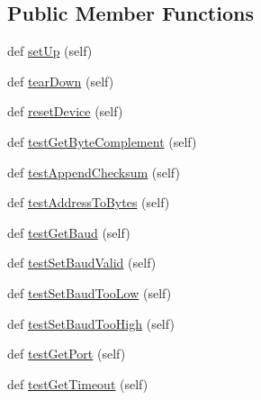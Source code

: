 \subsection*{Public Member Functions}
\begin{DoxyCompactItemize}
\item 
def \hyperlink{classstm__tools_1_1tests_1_1serialflasher__test_1_1SerialFlasherTestCase_a26b1b5aaa859d024cb7114cc1d4c1fd2}{set\+Up} (self)
\item 
def \hyperlink{classstm__tools_1_1tests_1_1serialflasher__test_1_1SerialFlasherTestCase_a56c54e463c817da67a20bb5e7b3b433a}{tear\+Down} (self)
\item 
def \hyperlink{classstm__tools_1_1tests_1_1serialflasher__test_1_1SerialFlasherTestCase_a3c64ad4ffc70313fb320cbff348ca340}{reset\+Device} (self)
\item 
def \hyperlink{classstm__tools_1_1tests_1_1serialflasher__test_1_1SerialFlasherTestCase_a6196826ae4218aa1d998d46082d63e32}{test\+Get\+Byte\+Complement} (self)
\item 
def \hyperlink{classstm__tools_1_1tests_1_1serialflasher__test_1_1SerialFlasherTestCase_ab3bae2350dc5fe3a1648fade1f3a220e}{test\+Append\+Checksum} (self)
\item 
def \hyperlink{classstm__tools_1_1tests_1_1serialflasher__test_1_1SerialFlasherTestCase_a7b9e64e2d4d21e7661b78b9be72fbc5c}{test\+Address\+To\+Bytes} (self)
\item 
def \hyperlink{classstm__tools_1_1tests_1_1serialflasher__test_1_1SerialFlasherTestCase_aa04254363060fbf88e9842fc5af0e984}{test\+Get\+Baud} (self)
\item 
def \hyperlink{classstm__tools_1_1tests_1_1serialflasher__test_1_1SerialFlasherTestCase_a09aac660829ca8fa8f1756fed0259dbf}{test\+Set\+Baud\+Valid} (self)
\item 
def \hyperlink{classstm__tools_1_1tests_1_1serialflasher__test_1_1SerialFlasherTestCase_aba049008f1b0bf098a9e9f385605f2b7}{test\+Set\+Baud\+Too\+Low} (self)
\item 
def \hyperlink{classstm__tools_1_1tests_1_1serialflasher__test_1_1SerialFlasherTestCase_a166cbd10369a00e75b9007161f8b4e2a}{test\+Set\+Baud\+Too\+High} (self)
\item 
def \hyperlink{classstm__tools_1_1tests_1_1serialflasher__test_1_1SerialFlasherTestCase_a5fb7594f713b3585700d0e388678e3be}{test\+Get\+Port} (self)
\item 
def \hyperlink{classstm__tools_1_1tests_1_1serialflasher__test_1_1SerialFlasherTestCase_a4c49f2b638d34ec72b059278a381ad51}{test\+Get\+Timeout} (self)

\end{DoxyCompactItemize}
